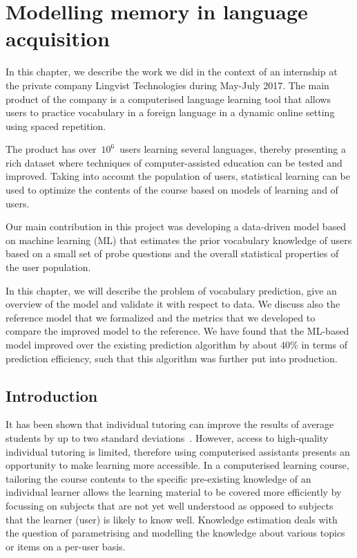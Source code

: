\chapter{Modelling memory in language acquisition}

In this chapter, we describe the work we did in the context of an internship at the private company Lingvist Technologies during May-July 2017. The main product of the company is a computerised language learning tool that allows users to practice vocabulary in a foreign language in a dynamic online setting using spaced repetition.

The product has over~$10^6$~users learning several languages, thereby presenting a rich dataset where techniques of computer-assisted education can be tested and improved. Taking into account the population of users, statistical learning can be used to optimize the contents of the course based on models of learning and of users.

Our main contribution in this project was developing a data-driven model based on machine learning (ML) that estimates the prior vocabulary knowledge of users based on a small set of probe questions and the overall statistical properties of the user population. 

In this chapter, we will describe the problem of vocabulary prediction, give an overview of the model and validate it with respect to data. We discuss also the reference model that we formalized and the metrics that we developed to compare the improved model to the reference. We have found that the ML-based model improved over the existing prediction algorithm by about 40\% in terms of prediction efficiency, such that this algorithm was further put into production.

\section{Introduction}
It has been shown that individual tutoring can improve the results of average students by up to two standard deviations~\cite{corbett2001cognitive}. However, access to high-quality individual tutoring is limited, therefore using computerised assistants presents an opportunity to make learning more accessible. In a computerised learning course, tailoring the course contents to the specific pre-existing knowledge of an individual learner allows the learning material to be covered more efficiently by focussing on subjects that are not yet well understood as opposed to subjects that the learner (user) is likely to know well. Knowledge estimation deals with the question of parametrising and modelling the knowledge about various topics or items on a per-user basis. 

